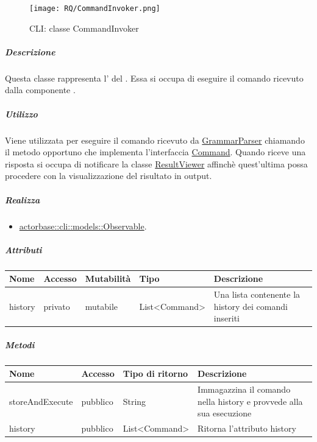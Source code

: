 \documentclass{scalatekids-article}
\begin{document}
\begin{figure}[H]
  \begin{center}
    \texttt{[image: RQ/CommandInvoker.png]}
    \caption{CLI: classe CommandInvoker}
  \end{center}
\end{figure}

\subparagraph{Descrizione}

Questa classe rappresenta l' del . Essa
si occupa di eseguire il comando ricevuto dalla componente .

\subparagraph{Utilizzo}

Viene utilizzata per eseguire il comando ricevuto da
\hyperref[sec:actorbase::cli::controllers::GrammarParser]{GrammarParser} chiamando il metodo opportuno che
implementa l'interfaccia \hyperref[sec:actorbase::cli::models::Command]{Command}.
Quando riceve una risposta si occupa di notificare la classe \hyperref[sec:actorbase::cli::views::ResultViewer]{ResultViewer}
affinchè quest'ultima possa procedere con la visualizzazione del risultato in output.

\subparagraph{Realizza}

\begin{itemize}
\item \hyperref[sec:actorbase::cli::models::Observable]{actorbase::cli::models::Observable}.
\end{itemize}

\subparagraph{Attributi}

\begin{tabular}{| p{2.5cm} | p{1.5cm} | p{2cm} | p{2.5cm} | p{8.5cm} |}
  \hline
  Nome & Accesso & Mutabilità & Tipo & Descrizione\\
  \hline
  history & privato & mutabile & List<Command> & Una lista contenente la history dei comandi inseriti\\
  \hline
\end{tabular}

\subparagraph{Metodi}

\begin{tabular}{| p{3cm} | p{1.5cm} | p{3.5cm} | p{9cm} |}
  \hline
  Nome & Accesso & Tipo di ritorno & Descrizione\\
  \hline
  storeAndExecute & pubblico & String & Immagazzina il comando nella history e provvede alla sua esecuzione\\
  \hline
  history & pubblico & List<Command> & Ritorna l'attributo history\\
  \hline
\end{tabular}
\end{document}
